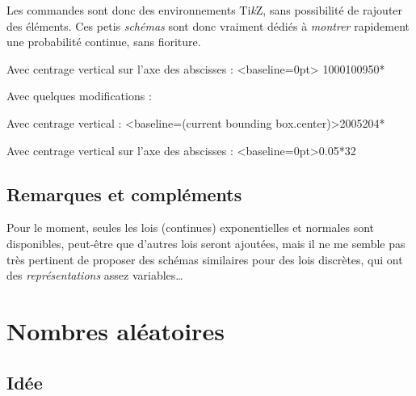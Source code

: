 \documentclass[a4paper,french,11pt]{article}
\providecommand\tikzlogo{Ti\textit{k}Z}
\let\TikZ\tikzlogo
\begin{document}
\begin{noteblock}
Les commandes sont donc des environnements \TikZ, sans possibilité de \og rajouter \fg{} des éléments. Ces petis \textit{schémas} sont donc vraiment dédiés à \textit{montrer} rapidement une probabilité continue, sans fioriture.
\end{noteblock}

\begin{PresCodePL}{}
Avec centrage vertical sur l'axe des abscisses :
\LoiNormaleGraphe
	[AfficheM=false,CouleurCourbe=blue,CouleurAire=cyan]<baseline=0pt>%
	{1000}{100}{950}{*}
\end{PresCodePL}

\begin{PresCodePL}{}
Avec quelques modifications :


\medskip

Avec centrage vertical :
\LoiNormaleGraphe[Largeur=5,Hauteur=2.5]<baseline=(current bounding box.center)>{200}{5}{204}{*}

\medskip

Avec centrage vertical sur l'axe des abscisses :
\LoiExpoGraphe
	[AfficheM=false,CouleurCourbe=blue,CouleurAire=cyan]<baseline=0pt>{0.05}{*}{32}

\medskip

\end{PresCodePL}

\subsection{Remarques et compléments}

\begin{noteblock}
Pour le moment, seules les lois (continues) exponentielles et normales sont disponibles, peut-être que d'autres lois seront ajoutées, mais il ne me semble pas très pertinent de proposer des schémas similaires pour des lois discrètes, qui ont des \textit{représentations} assez variables\ldots
\end{noteblock}

\newpage

\section{Nombres aléatoires}\label{entiersaleatoires}

\subsection{Idée}
\end{document}
